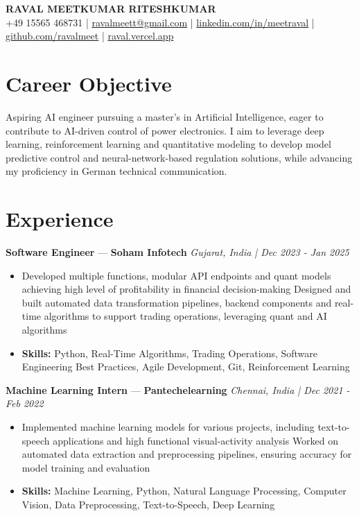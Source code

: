 \documentclass[a4paper,10pt]{article}
\begin{document}
\begin{center}
  {\Large\bfseries RAVAL MEETKUMAR RITESHKUMAR}\\[2pt]
  {\small +49 15565 468731 \;|\; \href{mailto:ravalmeett@gmail.com}{ravalmeett@gmail.com} \;|\; \href{https://www.linkedin.com/in/meetraval/}{linkedin.com/in/meetraval} \;|\; \href{https://github.com/ravalmeet}{github.com/ravalmeet} \;|\; \href{https://raval.vercel.app/}{raval.vercel.app}}
\end{center}
\vspace{-3pt}

\section*{Career Objective}
Aspiring AI engineer pursuing a master's in Artificial Intelligence, eager to contribute to AI-driven control of power electronics. I aim to leverage deep learning, reinforcement learning and quantitative modeling to develop model predictive control and neural-network-based regulation solutions, while advancing my proficiency in German technical communication.\par

\section*{Experience}
\textbf{Software Engineer} — \textbf{Soham Infotech} \hfill \textit{Gujarat, India \;|\; Dec 2023 - Jan 2025}\par
\vspace{1pt}
\begin{itemize}
  \item Developed multiple functions, modular API endpoints and quant models achieving high level of profitability in financial decision-making Designed and built automated data transformation pipelines, backend components and real-time algorithms to support trading operations, leveraging quant and AI algorithms
  \item \textbf{Skills:} Python, Real-Time Algorithms, Trading Operations, Software Engineering Best Practices, Agile Development, Git, Reinforcement Learning
\end{itemize}
\vspace{3pt}
\textbf{Machine Learning Intern} — \textbf{Pantechelearning} \hfill \textit{Chennai, India \;|\; Dec 2021 - Feb 2022}\par
\vspace{1pt}
\begin{itemize}
  \item Implemented machine learning models for various projects, including text-to-speech applications and high functional visual-activity analysis Worked on automated data extraction and preprocessing pipelines, ensuring accuracy for model training and evaluation
  \item \textbf{Skills:} Machine Learning, Python, Natural Language Processing, Computer Vision, Data Preprocessing, Text-to-Speech, Deep Learning
\end{itemize}
\end{document}

